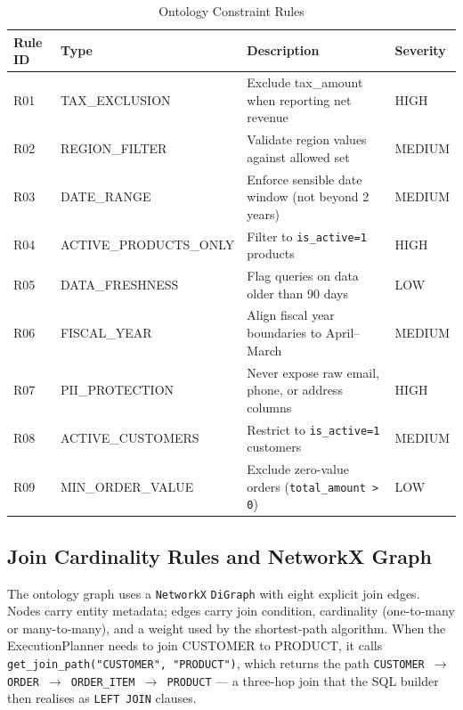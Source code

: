 \documentclass[12pt,a4paper]{report}
\begin{document}
\begin{table}[H]
  \centering
  \caption{Ontology Constraint Rules}
  \label{tab:constraints}
  \renewcommand{\arraystretch}{1.2}
  \begin{tabularx}{\textwidth}{@{}llXl@{}}
    \toprule
    \textbf{Rule ID} & \textbf{Type} & \textbf{Description} & \textbf{Severity} \\
    \midrule
    R01 & TAX\_EXCLUSION        & Exclude tax\_amount when reporting net revenue  & HIGH \\
    R02 & REGION\_FILTER        & Validate region values against allowed set       & MEDIUM \\
    R03 & DATE\_RANGE           & Enforce sensible date window (not beyond 2 years) & MEDIUM \\
    R04 & ACTIVE\_PRODUCTS\_ONLY & Filter to \texttt{is\_active=1} products          & HIGH \\
    R05 & DATA\_FRESHNESS       & Flag queries on data older than 90 days           & LOW \\
    R06 & FISCAL\_YEAR          & Align fiscal year boundaries to April--March       & MEDIUM \\
    R07 & PII\_PROTECTION       & Never expose raw email, phone, or address columns  & HIGH \\
    R08 & ACTIVE\_CUSTOMERS     & Restrict to \texttt{is\_active=1} customers        & MEDIUM \\
    R09 & MIN\_ORDER\_VALUE     & Exclude zero-value orders (\texttt{total\_amount > 0}) & LOW \\
    \bottomrule
  \end{tabularx}
\end{table}

\subsection{Join Cardinality Rules and NetworkX Graph}
\label{subsec:joins}

The ontology graph uses a \texttt{NetworkX} \texttt{DiGraph} with eight explicit join edges. Nodes carry entity metadata; edges carry join condition, cardinality (one-to-many or many-to-many), and a weight used by the shortest-path algorithm. When the ExecutionPlanner needs to join CUSTOMER to PRODUCT, it calls \texttt{get\_join\_path("CUSTOMER", "PRODUCT")}, which returns the path \texttt{CUSTOMER $\to$ ORDER $\to$ ORDER\_ITEM $\to$ PRODUCT} — a three-hop join that the SQL builder then realises as \texttt{LEFT JOIN} clauses.
\end{document}
